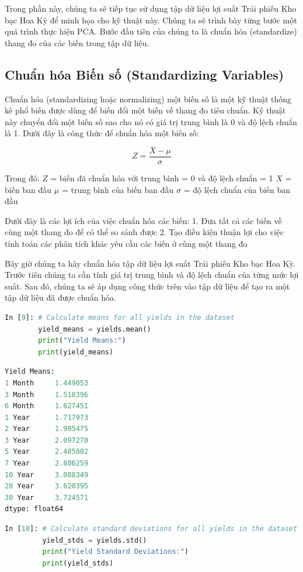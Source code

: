 Trong phần này, chúng ta sẽ tiếp tục sử dụng tập dữ liệu lợi suất Trái phiếu Kho bạc Hoa Kỳ để minh họa cho kỹ thuật này. Chúng ta sẽ trình bày từng bước một quá trình thực hiện PCA. Bước đầu tiên của chúng ta là chuẩn hóa (standardize) thang đo của các biến trong tập dữ liệu.

\subsection[Chuẩn hóa Biến số]{Chuẩn hóa Biến số (Standardizing Variables)}

Chuẩn hóa (standardizing hoặc normalizing) một biến số là một kỹ thuật thống kê phổ biến được dùng để biến đổi một biến về thang đo tiêu chuẩn. Kỹ thuật này chuyển đổi một biến số sao cho nó có giá trị trung bình là 0 và độ lệch chuẩn là 1. Dưới đây là công thức để chuẩn hóa một biến số:

$$Z=\frac{X-\mu}{\sigma}$$

Trong đó:
$Z$ = biến đã chuẩn hóa với trung bình = 0 và độ lệch chuẩn = 1
$X$ = biến ban đầu
$\mu$ = trung bình của biến ban đầu
$\sigma$ = độ lệch chuẩn của biến ban đầu

Dưới đây là các lợi ích của việc chuẩn hóa các biến:
1. Đưa tất cả các biến về cùng một thang đo để có thể so sánh được
2. Tạo điều kiện thuận lợi cho việc tính toán các phân tích khác yêu cầu các biến ở cùng một thang đo

Bây giờ chúng ta hãy chuẩn hóa tập dữ liệu lợi suất Trái phiếu Kho bạc Hoa Kỳ. Trước tiên chúng ta cần tính giá trị trung bình và độ lệch chuẩn của từng mức lợi suất. Sau đó, chúng ta sẽ áp dụng công thức trên vào tập dữ liệu để tạo ra một tập dữ liệu đã được chuẩn hóa.

\begin{lstlisting}[language=Python]
In [9]: # Calculate means for all yields in the dataset
        yield_means = yields.mean()
        print("Yield Means:")
        print(yield_means)
\end{lstlisting}

\begin{lstlisting}[language=Python]
Yield Means:
1 Month     1.449053
3 Month     1.518396
6 Month     1.627451
1 Year      1.717973
2 Year      1.905475
3 Year      2.097270
5 Year      2.485802
7 Year      2.806259
10 Year     3.088349
20 Year     3.620395
30 Year     3.724571
dtype: float64
\end{lstlisting}

\begin{lstlisting}[language=Python]
In [10]: # Calculate standard deviations for all yields in the dataset
         yield_stds = yields.std()
         print("Yield Standard Deviations:")
         print(yield_stds)
\end{lstlisting}

